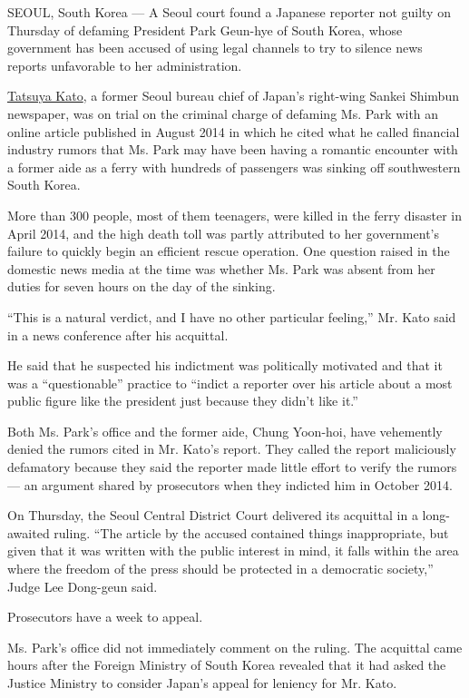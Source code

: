 SEOUL, South Korea --- A Seoul court found a Japanese reporter not
guilty on Thursday of defaming President Park Geun-hye of South Korea,
whose government has been accused of using legal channels to try to
silence news reports unfavorable to her administration.

\href{http://www.nytimes3xbfgragh.onion/2014/10/10/world/asia/japan-protests-an-indictment-of-a-journalist-.html}{Tatsuya
Kato}, a former Seoul bureau chief of Japan's right-wing Sankei Shimbun
newspaper, was on trial on the criminal charge of defaming Ms. Park with
an online article published in August 2014 in which he cited what he
called financial industry rumors that Ms. Park may have been having a
romantic encounter with a former aide as a ferry with hundreds of
passengers was sinking off southwestern South Korea.

More than 300 people, most of them teenagers, were killed in the ferry
disaster in April 2014, and the high death toll was partly attributed to
her government's failure to quickly begin an efficient rescue operation.
One question raised in the domestic news media at the time was whether
Ms. Park was absent from her duties for seven hours on the day of the
sinking.

``This is a natural verdict, and I have no other particular feeling,''
Mr. Kato said in a news conference after his acquittal.

He said that he suspected his indictment was politically motivated and
that it was a ``questionable'' practice to ``indict a reporter over his
article about a most public figure like the president just because they
didn't like it.''

Both Ms. Park's office and the former aide, Chung Yoon-hoi, have
vehemently denied the rumors cited in Mr. Kato's report. They called the
report maliciously defamatory because they said the reporter made little
effort to verify the rumors --- an argument shared by prosecutors when
they indicted him in October 2014.

On Thursday, the Seoul Central District Court delivered its acquittal in
a long-awaited ruling. ``The article by the accused contained things
inappropriate, but given that it was written with the public interest in
mind, it falls within the area where the freedom of the press should be
protected in a democratic society,'' Judge Lee Dong-geun said.

Prosecutors have a week to appeal.

Ms. Park's office did not immediately comment on the ruling. The
acquittal came hours after the Foreign Ministry of South Korea revealed
that it had asked the Justice Ministry to consider Japan's appeal for
leniency for Mr. Kato.

